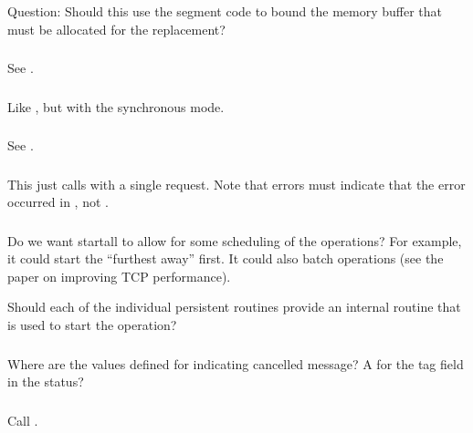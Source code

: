 \documentclass{article}
\begin{document}
\subsubsection{}
Question: Should this use the segment code to bound the memory buffer that
must be allocated for the replacement?

\subsubsection{}
See .

\subsubsection{}
Like , but with the synchronous mode.

\subsubsection{}
See .

\subsubsection{}
This just calls  with a single request.  Note that
errors must indicate that the error occurred in , not
.  

\subsubsection{}
Do we want startall to allow for some scheduling of the operations?  For
example, it could start the ``furthest away'' first.  It could also batch
operations (see the paper on improving TCP performance).

Should each of the individual persistent routines provide an internal
routine that is used to start the operation?

\subsubsection{}
Where are the values defined for indicating cancelled message?
A  for the tag field in the status?

\subsubsection{}
Call .
\end{document}
